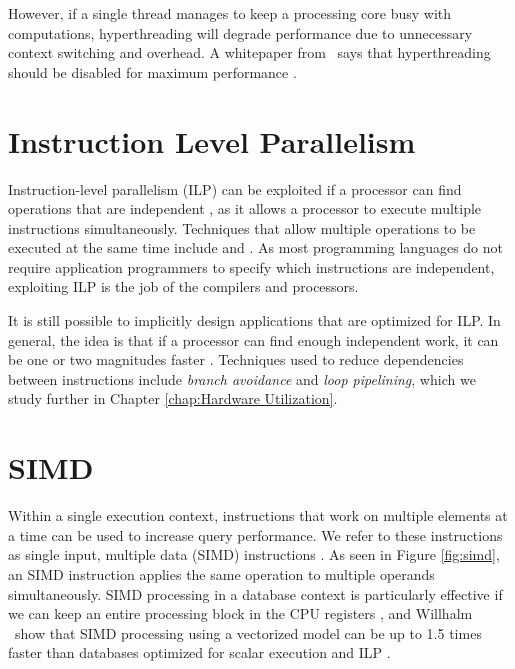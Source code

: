 However, if a single thread manages to keep a processing core busy with computations, hyperthreading will degrade performance due to unnecessary context switching and overhead. A whitepaper from \qlikview~says that hyperthreading should be disabled for maximum performance \cite{Qlik2011-yc}.

\section{Instruction Level Parallelism}
\label{sec:Instruction Level Parallelism}

Instruction-level parallelism (ILP) can be exploited if a processor can find operations that are independent \cite{Wikipedia_contributors2015-vg}, as it allows a processor to execute multiple instructions simultaneously. Techniques that allow multiple operations to be executed at the same time include  and . As most programming languages do not require application programmers to specify which instructions are independent, exploiting ILP is the job of the compilers and processors.

It is still possible to implicitly design applications that are optimized for ILP. In general, the idea is that if a processor can find enough independent work, it can be one or two magnitudes faster \cite{Boncz2005-wj}. Techniques used to reduce dependencies between instructions include \textit{branch avoidance} and \textit{loop pipelining}, which we study further in Chapter \ref{chap:Hardware Utilization}.

\section{SIMD}
\label{sec:SIMD}
Within a single execution context, instructions that work on multiple elements at a time can be used to increase query performance. We refer to these instructions as single input, multiple data (SIMD) instructions \cite{Wikipedia_contributors2015-ax}. As seen in Figure \ref{fig:simd}, an SIMD instruction applies the same operation to multiple operands simultaneously. SIMD processing in a database context is particularly effective if we can keep an entire processing block in the CPU registers \cite{Neumann2011-uq}, and Willhalm \ea~show that SIMD processing using a vectorized model can be up to 1.5 times faster than databases optimized for scalar execution and ILP \cite{Willhalm2009-hu}.

